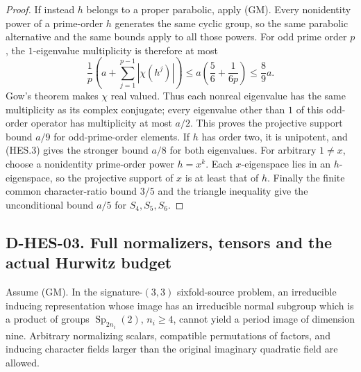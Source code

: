 \begin{proof}
If instead $h$ belongs to a proper parabolic, apply (GM). Every nonidentity
power of a prime-order $h$ generates the same cyclic group, so the same
parabolic alternative and the same bounds apply to all those powers.
For odd prime order $p$, the $1$-eigenvalue multiplicity is therefore at most
\[
 \frac1p\left(a+\sum_{j=1}^{p-1}|\chi(h^j)|\right)
 \le a\left(\frac56+\frac1{6p}\right)\le\frac89a.
\tag{HES.7}
\]
Gow's theorem makes $\chi$ real valued. Thus each nonreal eigenvalue has the
same multiplicity as its complex conjugate; every eigenvalue other than $1$
of this odd-order operator has multiplicity at most $a/2$. This proves the
projective support bound $a/9$ for odd-prime-order elements. If $h$ has order
two, it is unipotent, and (HES.3) gives the stronger bound $a/8$ for both
eigenvalues. For arbitrary $1\ne x$, choose a nonidentity prime-order power
$h=x^k$. Each $x$-eigenspace lies in an $h$-eigenspace, so the projective
support of $x$ is at least that of $h$. Finally the finite common character-ratio bound $3/5$ and the triangle
inequality give the unconditional bound $a/5$ for $S_4,S_5,S_6$.
\end{proof}

\subsection*{D-HES-03. Full normalizers, tensors and the actual Hurwitz budget}

\begin{proposition}
Assume (GM). In the signature-$(3,3)$ sixfold-source problem, an irreducible
inducing representation whose image has an irreducible normal subgroup
which is a product of groups $\operatorname{Sp}_{2n_i}(2)$, $n_i\ge4$,
cannot yield a period image of dimension nine. Arbitrary normalizing
scalars, compatible permutations of factors, and inducing character fields
larger than the original imaginary quadratic field are allowed.
\end{proposition}

